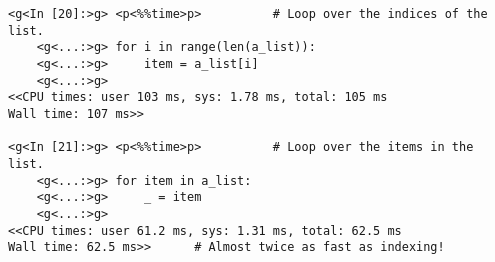 \begin{itemize}
\begin{lstlisting}
<g<In [20]:>g> <p<%%time>p>          # Loop over the indices of the list.
    <g<...:>g> for i in range(len(a_list)):
    <g<...:>g>     item = a_list[i]
    <g<...:>g>
<<CPU times: user 103 ms, sys: 1.78 ms, total: 105 ms
Wall time: 107 ms>>

<g<In [21]:>g> <p<%%time>p>          # Loop over the items in the list.
    <g<...:>g> for item in a_list:
    <g<...:>g>     _ = item
    <g<...:>g>
<<CPU times: user 61.2 ms, sys: 1.31 ms, total: 62.5 ms
Wall time: 62.5 ms>>      # Almost twice as fast as indexing!
\end{lstlisting}
\end{itemize}

\begin{comment} %
Second, swap values with a single assignment.

\begin{lstlisting}
>>> a, b = 1, 2
>>> a, b = b, a
>>> a, b
(2, 1)
\end{lstlisting}

Third, many non-Boolean objects in Python have truth values.
For example, numbers are \li{False} when equal to zero and \li{True} otherwise.
Similarly, lists and strings are \li{False} when they are empty and \li{True} otherwise.
The following code gives some examples.

\begin{lstlisting}
# Use the truth values of numbers.
>>> if 10:
...     print("Non-zero")
...
Non-zero

# Use the truth values of a list.
>>> my_list = [i for i in range(5)]
>>> if my_list:
...     print(my_list[0])
...
0
\end{lstlisting}
\end{comment}

